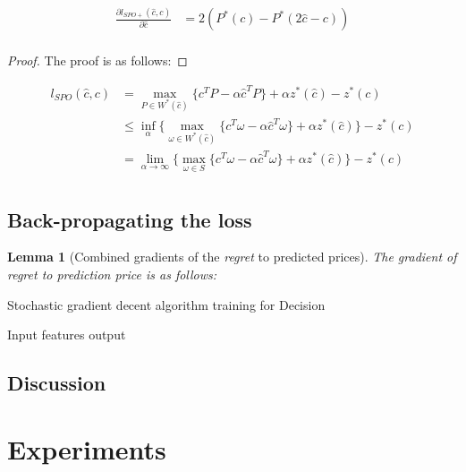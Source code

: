 \documentclass[journal]{IEEEtran}
\newtheorem{lemma}{Lemma}
\begin{document}
\begin{equation}
  \label{SPO+grad}
  \begin{aligned}
    \frac{\partial l_{SPO+}(\hat{c}, c)}{\partial \hat{c}} &= 2 (P^*(c) - P^*(2\hat{c} - c))\\ 
  \end{aligned}
\end{equation}

\begin{proof}
  The proof is as follows:
\end{proof}
\begin{equation}
  \label{SPO+deduction}
  \begin{aligned}
    l_{SPO}(\hat{c}, c) &= \max_{P \in W^*(\hat{c})} \{ c^T P - \alpha \hat{c}^T P\} + \alpha z^*(\hat{c}) - z^*(c) \\
    & \leq \inf_\alpha \{\max_{\omega \in W^*(\hat{c})} \{ c^T \omega - \alpha \hat{c}^T \omega\} + \alpha z^*(\hat{c}) \} - z^*(c) \\
    & = \lim_{\alpha\rightarrow \infty} \{\max_{\omega \in S }\{ c^T \omega - \alpha \hat{c}^T \omega\} + \alpha z^*(\hat{c}) \} - z^*(c) \\
  \end{aligned}
\end{equation}

\subsection{Back-propagating the loss}

\begin{lemma}[Combined gradients of the \textit{regret} to predicted prices]
  The gradient of regret to prediction price is as follows:
\end{lemma}
\begin{algorithm}
  \label{SGDOpt}
  \caption{Stochastic gradient decent algorithm training for Decision}
  \begin{algorithmic}
    \STATE Input features
    \STATE output
  \end{algorithmic}
\end{algorithm}

\subsection{Discussion}


\section{Experiments}
\end{document}
